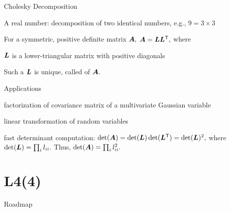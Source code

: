 \documentclass[handout,fleqn,aspectratio=169]{beamer}
\begin{document}
\begin{frame}{Cholesky Decomposition}

\plitemsep 0.1in

\bci

\item A real number: decomposition of two identical numbers, e.g., $9=3\times 3$

\item \thm For a symmetric, positive definite matrix $\bm{A},$ $\bm{A} = \bm{L}{\bm{L}}^{\mathsf{T}},$ where
\bci
\item $\bm{L}$ is a lower-triangular matrix with positive diagonals
\item Such a $\bm{L}$ is unique, called  of $\bm{A}.$
\eci

\item Applications
\bce[(a)]
\item factorization of covariance matrix of a multivariate Gaussian variable
\item linear transformation of random variables
\item fast determinant computation: $\det(\bm{A}) = \det(\bm{L})\det({\bm{L}}^{\mathsf{T}}) = \det(\bm{L})^2,$ where $\det(\bm{L}) = \prod_{i} l_{ii}.$ Thus, $\det(\bm{A}) = \prod_{i} l_{ii}^2.$
\ece
\eci

\end{frame}



\section{L4(4)}
\begin{frame}{Roadmap}

\plitemsep 0.1in

\bce[(1)] 
\item {}

\item {}

\item {}

\item {}

\item {}

\ece
\end{frame}
\end{document}
